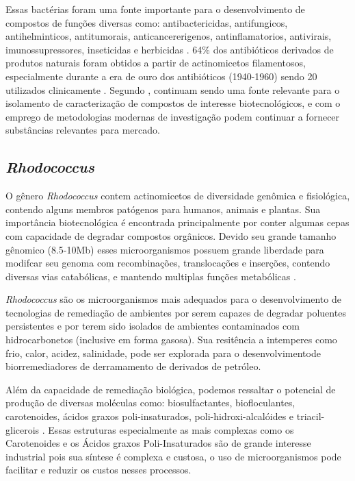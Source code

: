 Essas bactérias foram uma fonte importante para o desenvolvimento de compostos de funções
diversas como: antibactericidas, antifungicos, antihelminticos, antitumorais, anticancererigenos,
antinflamatorios, antivirais, imunossupressores, inseticidas e herbicidas \cite{demain2009,jose2021}. 
64\% dos antibióticos derivados de produtos naturais foram obtidos a partir de actinomicetos filamentosos,
especialmente durante a era de ouro dos antibióticos (1940-1960) sendo 20 utilizados clinicamente \cite{hutchings2019} .
Segundo , continuam sendo uma fonte relevante
para o isolamento de caracterização de compostos de interesse biotecnológicos, e com o
emprego de metodologias modernas de investigação podem continuar a fornecer
substâncias relevantes para mercado. 


\subsection{\textit{Rhodococcus}}
O gênero \textit{Rhodococcus} contem actinomicetos de diversidade genômica e fisiológica,
contendo alguns membros patógenos para humanos, animais e plantas. Sua importância biotecnológica
é encontrada principalmente por conter algumas cepas com capacidade de degradar compostos orgânicos.
Devido seu grande tamanho gênomico (8.5-10Mb) esses microorganismos possuem grande liberdade
para modifcar seu genoma com recombinações, translocações e inserções, contendo diversas vias catabólicas,
e mantendo multiplas funções metabólicas \cite{cappelletti2019}.

\textit{Rhodococcus} são os microorganismos mais adequados para o desenvolvimento de
tecnologias de remediação de ambientes por serem capazes de degradar poluentes persistentes e por
terem sido isolados de ambientes contaminados com hidrocarbonetos 
(inclusive em forma gasosa)\cite{kuyukina2019}. Sua resitência a intemperes como frio, calor, acidez,
salinidade, pode ser explorada para o desenvolvimentode biorremediadores de derramamento de derivados
de petróleo.

Além da capacidade de remediação biológica, podemos ressaltar o potencial de produção de diversas moléculas
como: biosulfactantes, biofloculantes, carotenoides, ácidos graxos poli-insaturados, poli-hidroxi-alcalóides e
triacil-glicerois \cite{cappelletti2020}. Essas estruturas especialmente as mais complexas como os
Carotenoides e os Ácidos graxos Poli-Insaturados são de grande interesse industrial pois sua síntese 
é complexa e custosa, o uso de microorganismos pode facilitar e reduzir os custos nesses processos.

